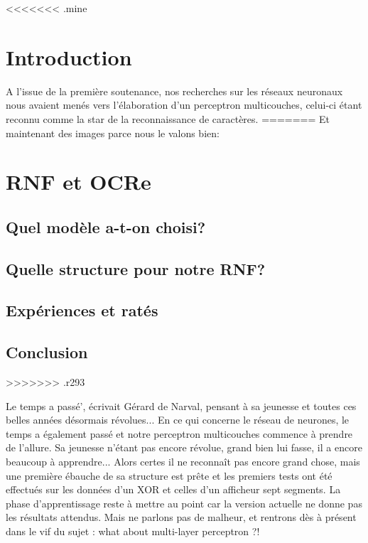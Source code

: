 <<<<<<< .mine
\section{Introduction} %
\label{subsec:introduction}
A l'issue de la premi\`ere soutenance, nos recherches sur les r\'eseaux
neuronaux nous avaient men\'es vers l'\'elaboration d'un perceptron
multicouches, celui-ci \'etant reconnu comme la star de la
reconnaissance de caract\`eres.
=======
Et maintenant des images parce nous le valons bien:


\section{RNF et OCRe}
\subsection{Quel mod\`ele a-t-on choisi?}
\subsection{Quelle structure pour notre RNF?}
\subsection{Exp\'eriences et rat\'es}
\subsection{Conclusion}
>>>>>>> .r293

Le temps a pass\'e', \'ecrivait G\'erard de Narval, pensant \`a sa jeunesse
et toutes ces belles ann\'ees d\'esormais r\'evolues... En ce qui
concerne le r\'eseau de neurones, le temps a \'egalement pass\'e et
notre perceptron multicouches commence \`a prendre de l'allure. Sa
jeunesse n'\'etant pas encore r\'evolue, grand bien lui fasse, il a
encore beaucoup \`a apprendre... Alors
certes il ne reconna\^it pas encore grand chose, mais une premi\`ere
\'ebauche de sa structure est pr\^ete et les premiers tests ont \'et\'e
effectu\'es sur les donn\'ees d'un XOR et celles d'un afficheur sept
segments. La phase d'apprentissage reste \`a mettre au point car la
version actuelle ne donne pas les r\'esultats attendus. Mais ne parlons
pas de malheur, et rentrons d\`es \`a pr\'esent dans le vif du sujet : what about
multi-layer perceptron ?! 

